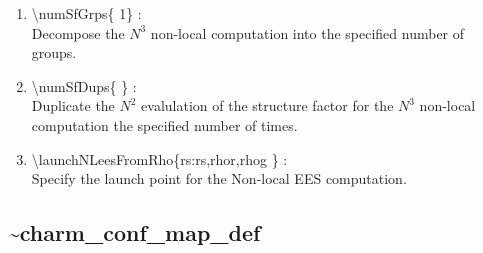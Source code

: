 \documentclass[12pt,titlepage]{article}
\begin{document}
\begin{enumerate}
  \vspace{0.15in} 
  \item \textbackslash numSfGrps\{ 1\} : \\    
  Decompose the $N^3$ non-local computation into the specified number of groups.
  \vspace{0.15in} 
  \item \textbackslash numSfDups\{ \} : \\    
  Duplicate the $N^2$ evalulation of the structure factor for the
  $N^3$ non-local computation the specified number of times.
  \vspace{0.15in} 
  \item \textbackslash launchNLeesFromRho\{rs:rs,rhor,rhog \} : \\  
  Specify the launch point for the Non-local EES computation.
\end{enumerate}

\newpage
\subsection*{\bf \~{ }charm\_conf\_map\_def}
\end{document}
